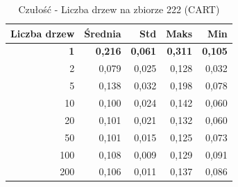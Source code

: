\begin{table}[htbp]
\centering
\small
\setlength{\tabcolsep}{6pt}
\renewcommand{\arraystretch}{1.2}
\caption{Czułość - Liczba drzew na zbiorze 222 (CART)}
\label{tab:CART_tree_count_222_recall}
\begin{tabular}{r|r|r|r|r}
\toprule
Liczba drzew & Średnia & Std & Maks & Min \\
\hline
\textbf{1} & \textbf{0,216} & \textbf{0,061} & \textbf{0,311} & \textbf{0,105} \\
2 & 0,079 & 0,025 & 0,128 & 0,032 \\
5 & 0,138 & 0,032 & 0,198 & 0,078 \\
10 & 0,100 & 0,024 & 0,142 & 0,060 \\
20 & 0,101 & 0,021 & 0,132 & 0,060 \\
50 & 0,101 & 0,015 & 0,125 & 0,073 \\
100 & 0,108 & 0,009 & 0,129 & 0,091 \\
200 & 0,106 & 0,011 & 0,137 & 0,086 \\
\bottomrule
\end{tabular}
\end{table}